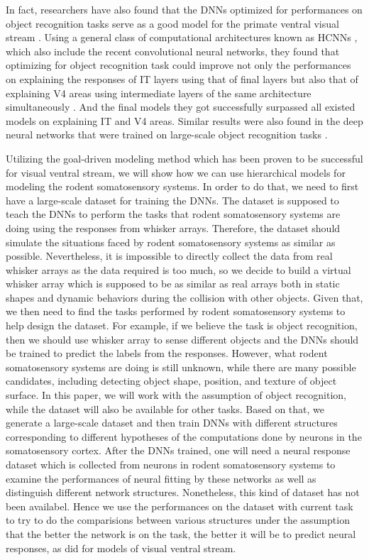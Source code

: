In fact, researchers have also found that the DNNs optimized for performances on object recognition tasks serve as a good model for the primate ventral visual stream \cite{Yamins2013, Yamins2014, cadieu2014deep}.
Using a general class of computational architectures known as HCNNs \cite{lecun1995convolutional}, which also include the recent convolutional neural networks, they found that optimizing for object recognition task could improve not only the performances on explaining the responses of IT layers using that of final layers but also that of explaining V4 areas using intermediate layers of the same architecture simultaneously \cite{cadieu2014deep}.
And the final models they got successfully surpassed all existed models on explaining IT and V4 areas. Similar results were also found in the deep neural networks that were trained on large-scale object recognition tasks \cite{Yamins2014}.

Utilizing the goal-driven modeling method which has been proven to be successful for visual ventral stream, we will show how we can use hierarchical models for modeling the rodent somatosensory systems.
In order to do that, we need to first have a large-scale dataset for training the DNNs.
The dataset is supposed to teach the DNNs to perform the tasks that rodent somatosensory systems are doing using the responses from whisker arrays.
Therefore, the dataset should simulate the situations faced by rodent somatosensory systems as similar as possible. 
Nevertheless, it is impossible to directly collect the data from real whisker arrays as the data required is too much, so we decide to build a virtual whisker array which is supposed to be as similar as real arrays both in static shapes and dynamic behaviors during the collision with other objects.
Given that, we then need to find the tasks performed by rodent somatosensory systems to help design the dataset. 
For example, if we believe the task is object recognition, then we should use whisker array to sense different objects and the DNNs should be trained to predict the labels from the responses.
However, what rodent somatosensory systems are doing is still unknown, while there are many possible candidates, including detecting object shape, position, and texture of object surface\cite{Boubenec2012,Diamond2008,Arabzadeh2005,OConnor2010}.
In this paper, we will work with the assumption of object recognition, while the dataset will also be available for other tasks. 
Based on that, we generate a large-scale dataset and then train DNNs with different structures corresponding to different hypotheses of the computations done by neurons in the somatosensory cortex.
After the DNNs trained, one will need a neural response dataset which is collected from neurons in rodent somatosensory systems to examine the performances of neural fitting by these networks as well as distinguish different network structures.
Nonetheless, this kind of dataset has not been availabel. Hence we use the performances on the dataset with current task to try to do the comparisions between various structures under the assumption that the better the network is on the task, the better it will be to predict neural responses, as did for models of visual ventral stream.


